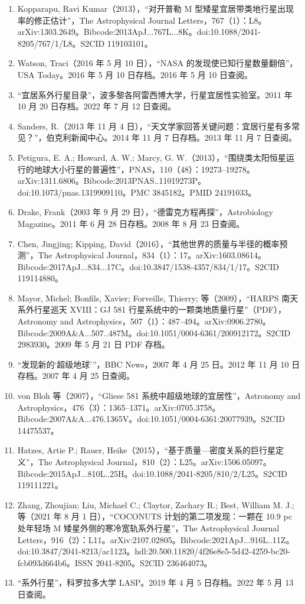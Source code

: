\begin{enumerate}
\item Kopparapu, Ravi Kumar（2013），“对开普勒 M 型矮星宜居带类地行星出现率的修正估计”，The Astrophysical Journal Letters，767（1）：L8。arXiv:1303.2649。Bibcode:2013ApJ...767L...8K。doi:10.1088/2041-8205/767/1/L8。S2CID 119103101。
\item Watson, Traci（2016 年 5 月 10 日），“NASA 的发现使已知行星数量翻倍”，USA Today。2016 年 5 月 10 日存档。2016 年 5 月 10 日查阅。
\item “宜居系外行星目录”，波多黎各阿雷西博大学，行星宜居性实验室。2011 年 10 月 20 日存档。2022 年 7 月 12 日查阅。
\item Sanders, R.（2013 年 11 月 4 日），“天文学家回答关键问题：宜居行星有多常见？”，伯克利新闻中心。2014 年 11 月 7 日存档。2013 年 11 月 7 日查阅。
\item Petigura, E. A.; Howard, A. W.; Marcy, G. W.（2013），“围绕类太阳恒星运行的地球大小行星的普遍性”，PNAS，110（48）：19273–19278。arXiv:1311.6806。Bibcode:2013PNAS..11019273P。doi:10.1073/pnas.1319909110。PMC 3845182。PMID 24191033。
\item Drake, Frank（2003 年 9 月 29 日），“德雷克方程再探”，Astrobiology Magazine。2011 年 6 月 28 日存档。2008 年 8 月 23 日查阅。
\item Chen, Jingjing; Kipping, David（2016），“其他世界的质量与半径的概率预测”，The Astrophysical Journal，834（1）：17。arXiv:1603.08614。Bibcode:2017ApJ...834...17C。doi:10.3847/1538-4357/834/1/17。S2CID 119114880。
\item Mayor, Michel; Bonfils, Xavier; Forveille, Thierry; 等（2009），“HARPS 南天系外行星巡天 XVIII：GJ 581 行星系统中的一颗类地质量行星”（PDF），Astronomy and Astrophysics，507（1）：487–494。arXiv:0906.2780。Bibcode:2009A&A...507..487M。doi:10.1051/0004-6361/200912172。S2CID 2983930。2009 年 5 月 21 日 PDF 存档。
\item “发现新的‘超级地球’”，BBC News，2007 年 4 月 25 日。2012 年 11 月 10 日存档。2007 年 4 月 25 日查阅。
\item von Bloh 等（2007），“Gliese 581 系统中超级地球的宜居性”，Astronomy and Astrophysics，476（3）：1365–1371。arXiv:0705.3758。Bibcode:2007A&A...476.1365V。doi:10.1051/0004-6361:20077939。S2CID 14475537。
\item Hatzes, Artie P.; Rauer, Heike（2015），“基于质量—密度关系的巨行星定义”，The Astrophysical Journal，810（2）：L25。arXiv:1506.05097。Bibcode:2015ApJ...810L..25H。doi:10.1088/2041-8205/810/2/L25。S2CID 119111221。
\item Zhang, Zhoujian; Liu, Michael C.; Claytor, Zachary R.; Best, William M. J.; 等（2021 年 8 月 1 日），“COCONUTS 计划的第二项发现：一颗在 10.9 pc 处年轻场 M 矮星外侧的寒冷宽轨系外行星”，The Astrophysical Journal Letters，916（2）：L11。arXiv:2107.02805。Bibcode:2021ApJ...916L..11Z。doi:10.3847/2041-8213/ac1123。hdl:20.500.11820/4f26e8e5-5d42-4259-bc20-fcb093d664b6。ISSN 2041-8205。S2CID 236464073。
\item “系外行星”，科罗拉多大学 LASP。2019 年 4 月 5 日存档。2022 年 5 月 13 日查阅。


\end{enumerate}
